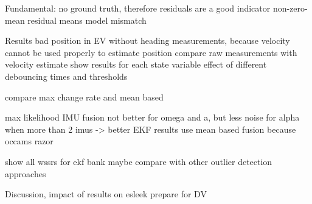 Fundamental: no ground truth, therefore residuals are a good indicator
non-zero-mean residual means model mismatch~\cite[p.~158]{AlexanderWischnewski.2019}

Results
bad position in EV without heading measurements, because velocity cannot be used properly to estimate position
compare raw measurements with velocity estimate
show results for each state variable
effect of different debouncing times and thresholds

compare max change rate and mean based

max likelihood IMU fusion not better for omega and a, but less noise for alpha when more than 2 imus -> better EKF results
use mean based fusion because occams razor

show all wssrs for ekf bank
maybe compare with other outlier detection approaches


Discussion, impact of results on esleek
prepare for DV
